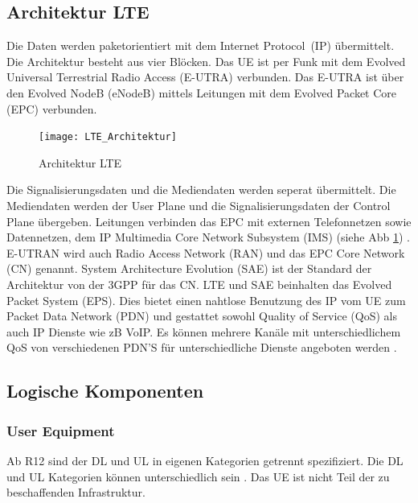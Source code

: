 \subsection{Architektur LTE}
\label{subsec:architektur}
Die Daten werden paketorientiert mit dem Internet Protocol~(IP) übermittelt. Die Architektur besteht aus vier Blöcken. Das UE ist per Funk mit dem Evolved Universal Terrestrial Radio Access (E-UTRA) verbunden. Das E-UTRA ist über den Evolved NodeB (eNodeB) mittels Leitungen mit dem Evolved Packet Core (EPC) verbunden.
\begin{figure}[H]
	\centering
	\texttt{[image: LTE\_Architektur]}
	\caption{Architektur LTE \protect\cite{Fir19}}
	\label{fig:bildarchitektur}
\end{figure}
Die Signalisierungsdaten und die Mediendaten werden seperat übermittelt. Die Mediendaten werden der User Plane und die Signalisierungsdaten der Control Plane übergeben. Leitungen verbinden das EPC mit externen Telefonnetzen sowie Datennetzen, dem IP Multimedia Core Network Subsystem (IMS) (siehe Abb \ref{fig:bildarchitektur}) \cite{Fir19}.
E-UTRAN wird auch Radio Access Network (RAN) und das EPC Core Network (CN) genannt. System Architecture Evolution (SAE) ist der Standard der Architektur von der 3GPP für das CN. LTE und SAE beinhalten das Evolved Packet System (EPS). Dies bietet einen nahtlose Benutzung des IP vom UE zum Packet Data Network (PDN) und gestattet sowohl Quality of Service (QoS) als auch IP Dienste wie zB VoIP. Es können mehrere Kanäle mit unterschiedlichem QoS von verschiedenen PDN'S für unterschiedliche Dienste angeboten werden \cite{Ses11}.
\subsection{Logische Komponenten}
\label{subsec:logkomponenten}
\subsubsection{User Equipment}
\label{subsubsec:ue}
Ab R12 sind der DL und UL in eigenen Kategorien getrennt spezifiziert. Die DL und UL Kategorien können unterschiedlich sein \cite{GPP19}. Das UE ist nicht Teil der zu beschaffenden Infrastruktur. 
